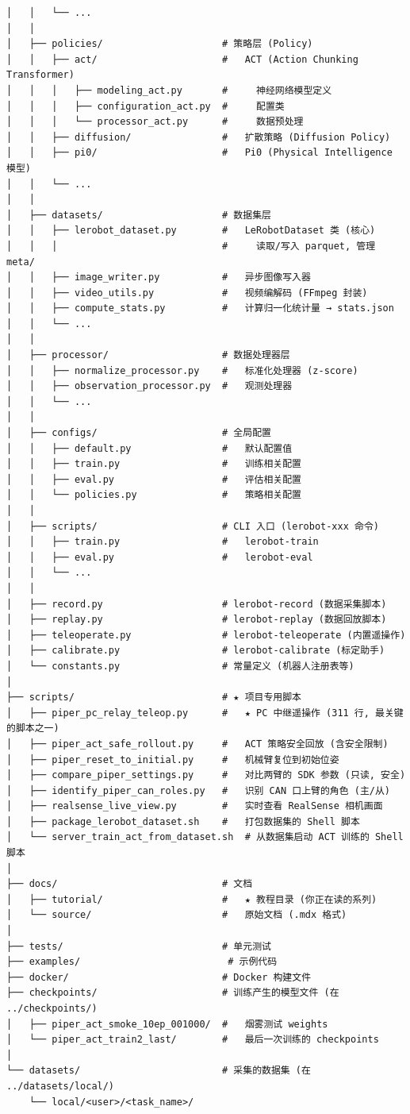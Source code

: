 \documentclass[UTF8,a4paper,11pt]{ctexart}
\begin{document}
\begin{lstlisting}[language=text]
│   │   └── ...
│   │
│   ├── policies/                     # 策略层 (Policy)
│   │   ├── act/                      #   ACT (Action Chunking Transformer)
│   │   │   ├── modeling_act.py       #     神经网络模型定义
│   │   │   ├── configuration_act.py  #     配置类
│   │   │   └── processor_act.py      #     数据预处理
│   │   ├── diffusion/                #   扩散策略 (Diffusion Policy)
│   │   ├── pi0/                      #   Pi0 (Physical Intelligence 模型)
│   │   └── ...
│   │
│   ├── datasets/                     # 数据集层
│   │   ├── lerobot_dataset.py        #   LeRobotDataset 类 (核心)
│   │   │                             #     读取/写入 parquet, 管理 meta/
│   │   ├── image_writer.py           #   异步图像写入器
│   │   ├── video_utils.py            #   视频编解码 (FFmpeg 封装)
│   │   ├── compute_stats.py          #   计算归一化统计量 → stats.json
│   │   └── ...
│   │
│   ├── processor/                    # 数据处理器层
│   │   ├── normalize_processor.py    #   标准化处理器 (z-score)
│   │   ├── observation_processor.py  #   观测处理器
│   │   └── ...
│   │
│   ├── configs/                      # 全局配置
│   │   ├── default.py                #   默认配置值
│   │   ├── train.py                  #   训练相关配置
│   │   ├── eval.py                   #   评估相关配置
│   │   └── policies.py               #   策略相关配置
│   │
│   ├── scripts/                      # CLI 入口 (lerobot-xxx 命令)
│   │   ├── train.py                  #   lerobot-train
│   │   ├── eval.py                   #   lerobot-eval
│   │   └── ...
│   │
│   ├── record.py                     # lerobot-record (数据采集脚本)
│   ├── replay.py                     # lerobot-replay (数据回放脚本)
│   ├── teleoperate.py                # lerobot-teleoperate (内置遥操作)
│   ├── calibrate.py                  # lerobot-calibrate (标定助手)
│   └── constants.py                  # 常量定义 (机器人注册表等)
│
├── scripts/                          # ★ 项目专用脚本
│   ├── piper_pc_relay_teleop.py      #   ★ PC 中继遥操作 (311 行, 最关键的脚本之一)
│   ├── piper_act_safe_rollout.py     #   ACT 策略安全回放 (含安全限制)
│   ├── piper_reset_to_initial.py     #   机械臂复位到初始位姿
│   ├── compare_piper_settings.py     #   对比两臂的 SDK 参数 (只读, 安全)
│   ├── identify_piper_can_roles.py   #   识别 CAN 口上臂的角色 (主/从)
│   ├── realsense_live_view.py        #   实时查看 RealSense 相机画面
│   ├── package_lerobot_dataset.sh    #   打包数据集的 Shell 脚本
│   └── server_train_act_from_dataset.sh  # 从数据集启动 ACT 训练的 Shell 脚本
│
├── docs/                             # 文档
│   ├── tutorial/                     #   ★ 教程目录 (你正在读的系列)
│   └── source/                       #   原始文档 (.mdx 格式)
│
├── tests/                            # 单元测试
├── examples/                          # 示例代码
├── docker/                           # Docker 构建文件
├── checkpoints/                      # 训练产生的模型文件 (在 ../checkpoints/)
│   ├── piper_act_smoke_10ep_001000/  #   烟雾测试 weights
│   └── piper_act_train2_last/        #   最后一次训练的 checkpoints
│
└── datasets/                         # 采集的数据集 (在 ../datasets/local/)
    └── local/<user>/<task_name>/
\end{lstlisting}
\end{document}
